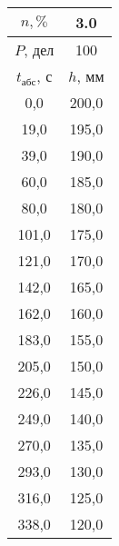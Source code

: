 \begin{tabular}[t]{|c|c|}
\hline
$n, \%$ & 3.0 \\
\hline
$P$, дел & 100 \\
\hline
$t_{абс}$, с & $h$, мм \\ 
\hline
0,0 & 200,0 \\ 
19,0 & 195,0 \\ 
39,0 & 190,0 \\ 
60,0 & 185,0 \\ 
80,0 & 180,0 \\ 
101,0 & 175,0 \\ 
121,0 & 170,0 \\ 
142,0 & 165,0 \\ 
162,0 & 160,0 \\ 
183,0 & 155,0 \\ 
205,0 & 150,0 \\ 
226,0 & 145,0 \\ 
249,0 & 140,0 \\ 
270,0 & 135,0 \\ 
293,0 & 130,0 \\ 
316,0 & 125,0 \\ 
338,0 & 120,0 \\ 
\hline
\end{tabular}